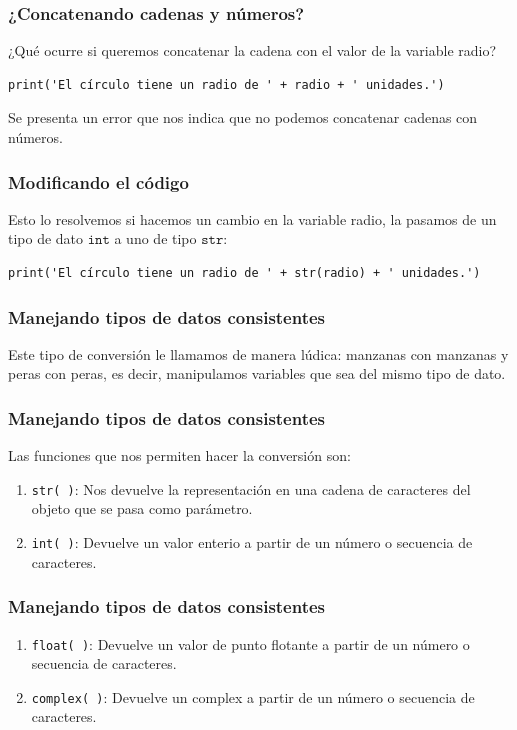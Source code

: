 \documentclass[12pt]{beamer}
\begin{document}
\begin{frame}[fragile]
\frametitle{¿Concatenando cadenas y números?}
¿Qué ocurre si queremos concatenar la cadena con el valor de la variable radio?
\pause
\begin{lstlisting}[caption=Ejemplo de concatenación de cadenas y números]
print('El círculo tiene un radio de ' + radio + ' unidades.')
\end{lstlisting}
\pause
Se presenta un error que nos indica que no podemos concatenar cadenas con números.
\end{frame}
\begin{frame}[fragile]
\frametitle{Modificando el código}
Esto lo resolvemos si hacemos un cambio en la variable radio, la pasamos de un tipo de dato $\texttt{int}$ a uno de tipo $\texttt{str}$:
\pause
\begin{lstlisting}[caption=Usando función de conversión de tipo de dato]
print('El círculo tiene un radio de ' + str(radio) + ' unidades.')
\end{lstlisting}
\end{frame}
\begin{frame}
\frametitle{Manejando tipos de datos consistentes}
Este tipo de conversión le llamamos de manera lúdica: manzanas con manzanas y peras con peras, es decir, manipulamos variables que sea del mismo tipo de dato.
\end{frame}
\begin{frame}
\frametitle{Manejando tipos de datos consistentes}
Las funciones que nos permiten hacer la conversión son:
\pause
{}
\begin{enumerate}[<+->]
\item \texttt{str( )}: Nos devuelve la representación en una cadena de caracteres del objeto que se pasa como parámetro.
\item \texttt{int( )}: Devuelve un valor enterio a partir de un número o secuencia de caracteres.
\seti
\end{enumerate}
\end{frame}
\begin{frame}
\frametitle{Manejando tipos de datos consistentes}
\begin{enumerate}[<+->]    
\conti 
\item \texttt{float( )}: Devuelve un valor de punto flotante a partir de un número o secuencia de caracteres.
\item \texttt{complex( )}: Devuelve un complex a partir de un número o secuencia de caracteres.
\end{enumerate}
\end{frame}
\end{document}
